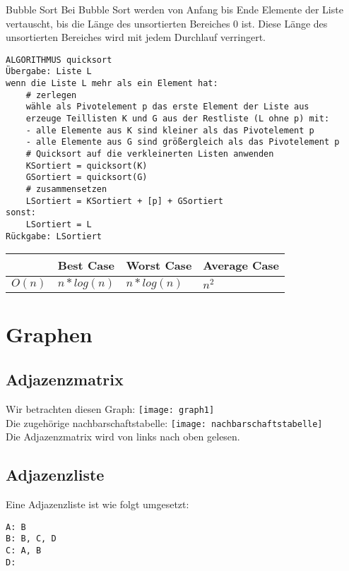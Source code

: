 \begin{zitat}{Bubble Sort}
Bei Bubble Sort werden von Anfang bis Ende Elemente der Liste vertauscht, bis die Länge des unsortierten Bereiches 0 ist. Diese Länge des unsortierten Bereiches wird mit jedem Durchlauf verringert.
\end{zitat}
\begin{lstlisting}
ALGORITHMUS quicksort
Übergabe: Liste L
wenn die Liste L mehr als ein Element hat:
    # zerlegen
    wähle als Pivotelement p das erste Element der Liste aus
    erzeuge Teillisten K und G aus der Restliste (L ohne p) mit:
    - alle Elemente aus K sind kleiner als das Pivotelement p
    - alle Elemente aus G sind größergleich als das Pivotelement p
    # Quicksort auf die verkleinerten Listen anwenden
    KSortiert = quicksort(K)
    GSortiert = quicksort(G)
    # zusammensetzen
    LSortiert = KSortiert + [p] + GSortiert
sonst:
    LSortiert = L
Rückgabe: LSortiert
\end{lstlisting}
\begin{table}[h]
\label{tab:my-table}
\begin{tabular}{l|l|l|l|}
\cline{2-4}
                             & Best Case & Worst Case & Average Case \\ \hline
\multicolumn{1}{|l|}{$O(n)$} & $n* log(n)$     & $n * log(n)$      & $n^2$        \\ \hline
\end{tabular}
\end{table}

\section{Graphen}
\subsection{Adjazenzmatrix}
Wir betrachten diesen Graph:
\texttt{[image: graph1]}\\
Die zugehörige nachbarschaftstabelle:
\texttt{[image: nachbarschaftstabelle]}\\
Die Adjazenzmatrix wird von links nach oben gelesen.
\subsection{Adjazenzliste}
Eine Adjazenzliste ist wie folgt umgesetzt:
\begin{lstlisting}
A: B
B: B, C, D
C: A, B
D:
\end{lstlisting}
\newpage
